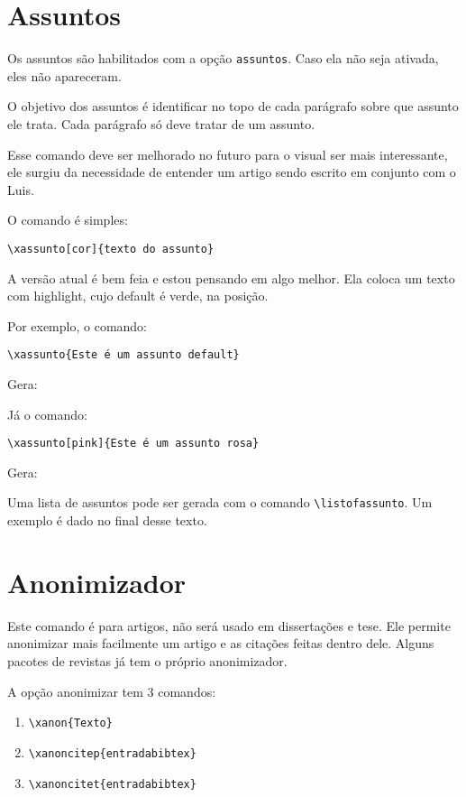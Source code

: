 \documentclass{article}
\begin{document}
\section{Assuntos}

Os assuntos são habilitados com a opção \verb!assuntos!. Caso ela não seja ativada, eles não apareceram.

O objetivo dos assuntos é identificar no topo de cada parágrafo sobre que assunto ele trata. Cada parágrafo só deve tratar de um assunto.

Esse comando deve ser melhorado no futuro para o visual ser mais interessante, ele surgiu da necessidade de entender um artigo sendo escrito em conjunto com o Luis.

O comando é simples:

\begin{verbatim}
\xassunto[cor]{texto do assunto}
\end{verbatim}

A versão atual é bem feia e estou pensando em algo melhor. Ela coloca um texto com highlight, cujo default é verde, na posição.

Por exemplo, o comando:
\begin{verbatim}
\xassunto{Este é um assunto default}    
\end{verbatim}

Gera:


Já o comando:
\begin{verbatim}
\xassunto[pink]{Este é um assunto rosa}   
\end{verbatim}

Gera:


Uma lista de assuntos pode ser gerada com o comando
\verb!\listofassunto!. Um exemplo é dado no final desse texto.

\section{Anonimizador}

Este comando é para artigos, não será usado em dissertações e tese. Ele permite anonimizar mais facilmente um artigo e as citações feitas dentro dele. Alguns pacotes de revistas já tem o próprio anonimizador.

A opção anonimizar tem 3 comandos:
\begin{enumerate}
    \item \verb!\xanon{Texto}!
    \item \verb!\xanoncitep{entradabibtex}!
    \item \verb!\xanoncitet{entradabibtex}!
\end{enumerate}
\end{document}
